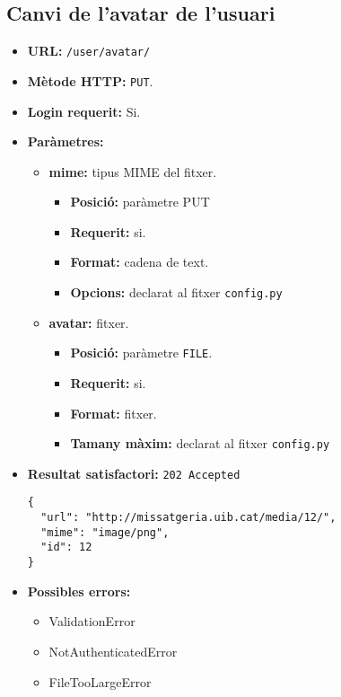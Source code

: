 \subsection{Canvi de l'avatar de l'usuari}
\begin{itemize}
\item \textbf{\ac{URL}:} \texttt{/user/avatar/}
\item \textbf{Mètode \ac{HTTP}: } \texttt{PUT}.
\item \textbf{Login requerit:} Si.
\item \textbf{Paràmetres:} 
	\begin{itemize}
		\item \textbf{mime:} tipus \ac{MIME} del fitxer.
		\begin{itemize}
			\item \textbf{Posició:} paràmetre \ac{PUT}
			\item \textbf{Requerit:} si.
			\item \textbf{Format:} cadena de text.
			\item \textbf{Opcions:} declarat al fitxer \texttt{config.py}
		\end{itemize}
		\item \textbf{avatar:} fitxer.
		\begin{itemize}
			\item \textbf{Posició:} paràmetre \texttt{FILE}.
			\item \textbf{Requerit:} si.
			\item \textbf{Format:} fitxer.
			\item \textbf{Tamany màxim:} declarat al fitxer \texttt{config.py}

		\end{itemize}
	\end{itemize}

\item \textbf{Resultat satisfactori:} \texttt{202 Accepted}
	\begin{verbatim}
{
  "url": "http://missatgeria.uib.cat/media/12/",
  "mime": "image/png",
  "id": 12
}
	\end{verbatim}
	

\item \textbf{Possibles errors:}
	\begin{itemize}
		\item ValidationError
		\item NotAuthenticatedError
		\item FileTooLargeError
	\end{itemize}
\end{itemize}

